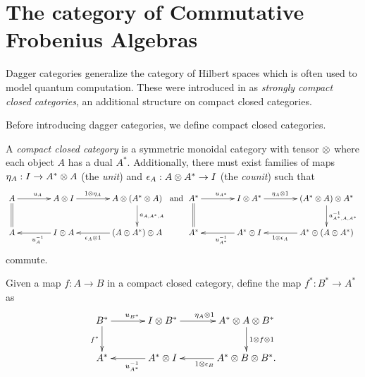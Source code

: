 \section{The category of Commutative Frobenius Algebras} %
\label{sec:the_category_of_commutative_frobenius_algebras}
Dagger categories generalize the category of Hilbert spaces which is often used to model quantum
computation. These were introduced in \cite{abramsky04:catsemquantprot} as \emph{strongly compact
closed categories}, an additional structure on compact closed categories.

Before introducing dagger categories, we define compact closed
categories.



\begin{definition}\label{def:compactclosedcat}
A \emph{compact closed category} \cD{} is a symmetric monoidal category with tensor $\otimes$ where each
object $A$ has a dual $A^{*}$. Additionally, there must exist families of maps $\eta_{A}: I \to
A^{*} \otimes A$ (the \emph{unit}) and $\epsilon_{A}: A\otimes A^{*}\to I$ (the \emph{counit}) such that
\[
  \xymatrix@C+15pt{
    A \ar[r]^{u_{A}} \ar@{=}[d]  & A\*I \ar[r]^(.4){1\*\eta_{A}}
        & A\* (A^{*}\*A) \ar[d]^{a_{A,A^{*},A}} \\
    A & I\* A \ar[l]^{u_{A}^{-1}} & (A\* A^{*})\*A \ar[l]^(.6){\epsilon_{A}\*1}
    }\text{ and }
  \xymatrix@C+15pt{
    A^{*} \ar[r]^{u_{A^*}} \ar@{=}[d]  & I\*A^* \ar[r]^(.4){\eta_{A}\*1}
        & (A^{*}\* A)\*A^{*} \ar[d]^{a_{A^{*},A,A^{*}}^{-1}} \\
    A^* & A^*\*I \ar[l]^{u_{A^*}^{-1}} & A^{*}\*(A\*A^{*}) \ar[l]^(.6){1\*\epsilon_{A}}
    }
  \]
commute.
\end{definition}

Given a map $f:A\to B$ in a compact closed category,  define the map $f^{*}:B^{*} \to A^{*}$ as
\[
  \xymatrix@C+10pt{
    B^{*}\ar[r]^{u_{B^{*}}} \ar[d]_{f^{*}}& I\*B^{*} \ar[r]^{\eta_{A}\*1}
      & A^{*}\*A\*B^{*}\ar[d]^{1\*f\*1}\\
    A^{*}&    A^{*}\*I\ar[l]^{u_{A^{*}}^{-1}}  &   A^{*}\*B\*B^{*}\ar[l]^{1\*\epsilon_{B}}.
  }
\]






